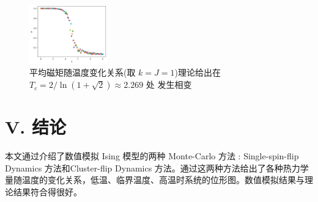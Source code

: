 \documentclass[aps,prl,twocolumn,groupedaddress]{revtex4-2}
\begin{document}
\begin{figure}[H]
    \centering
    \includegraphics[width=0.3\textwidth]{img/fig6.png}
    \caption{平均磁矩随温度变化关系(取 $k=J=1$)理论给出在 $T_c=2/\ln(1+\sqrt{2})\approx 2.269 $ 处 发生相变}
    \label{fig6}
\end{figure}

\section{V. 结论}

本文通过介绍了数值模拟 Ising 模型的两种 Monte-Carlo 方法 : Single-spin-flip Dynamics 方法和Cluster-flip Dynamics 方法。通过这两种方法给出了各种热力学量随温度的变化关系，低温、临界温度、高温时系统的位形图。数值模拟结果与理论结果符合得很好。


%


\end{document}
